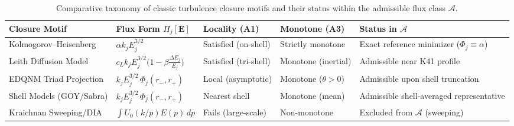 \documentclass[12pt,a4paper]{article}
\theoremstyle{definition}
\theoremstyle{plain}
\theoremstyle{remark}
\begin{document}
\begin{table}[htbp]
\centering
\small
\setlength{\tabcolsep}{3.2pt}
\renewcommand{\arraystretch}{1.18}
\begin{tabular}{L{0.20\textwidth}L{0.25\textwidth}L{0.13\textwidth}L{0.13\textwidth}L{0.21\textwidth}}
\toprule
\textbf{Closure Motif} & \textbf{Flux Form $\Pi_j[\mathbf{E}]$} & \textbf{Locality (A1)} & \textbf{Monotone (A3)} & \textbf{Status in $\mathscr{A}$} \\
\midrule
Kolmogorov--\allowbreak Heisenberg & $\alpha k_j E_j^{3/2}$ & Satisfied (on-shell) & Strictly monotone & Exact reference minimizer ($\Phi_j \equiv \alpha$) \\
\addlinespace[3pt]
Leith Diffusion Model & $c_L k_j E_j^{3/2}\bigl(1 - \beta \frac{\Delta E_j}{E_j}\bigr)$ & Satisfied (tri-shell) & Monotone (inertial) & Admissible near K41 profile \\
\addlinespace[3pt]
EDQNM Triad Projection & $k_j E_j^{3/2}\,\Phi_j(r_-, r_+)$ & Local (asymptotic) & Monotone ($\theta > 0$) & Admissible upon shell truncation \\
\addlinespace[3pt]
Shell Models (GOY/Sabra) & $k_j E_j^{3/2}\,\Phi_j(r_-, r_+)$ & Nearest shell & Monotone (mean) & Admissible shell-averaged representative \\
\addlinespace[3pt]
Kraichnan Sweeping/DIA & $\int U_0(k/p) E(p)\,dp$ & Fails (large-scale) & Non-monotone & Excluded from $\mathscr{A}$ (sweeping) \\
\bottomrule
\end{tabular}
\caption{Comparative taxonomy of classic turbulence closure motifs and their status within the admissible flux class $\mathscr{A}$.}
\label{tab:closure-comparison}\label{tab:closure-vergleich}
\end{table}
\end{document}
